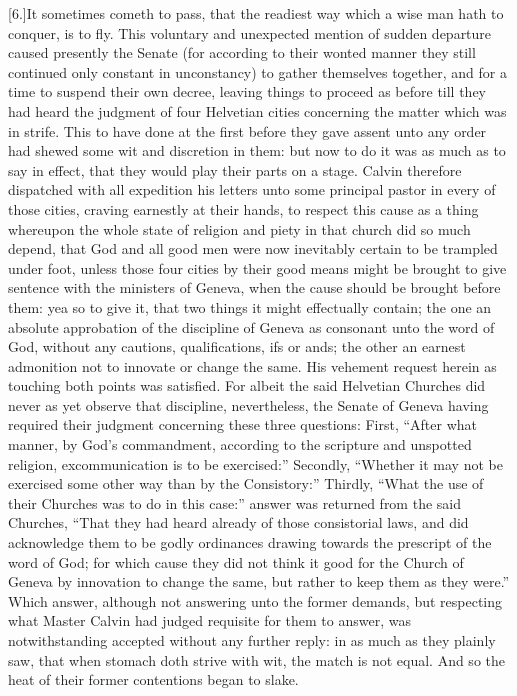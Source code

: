 [6.]It sometimes cometh to pass, that the readiest way which a wise man hath to conquer, is to fly. This voluntary and unexpected mention of sudden departure caused presently the Senate (for according to their wonted manner they still continued only constant in unconstancy) to gather themselves together, and for a time to suspend their own decree, leaving things to proceed as before till they had heard the judgment of four Helvetian cities concerning the matter which was in strife. This to have done at the first before they gave assent unto any order had shewed some wit and discretion in them: but now to do it was as much as to say in effect, that they would play their parts on a stage. Calvin therefore dispatched with all expedition his letters unto some principal pastor in every of those cities, craving earnestly at their hands, to respect this cause as a thing whereupon the whole state of religion and piety in that church did so much depend, that God and all good men were now inevitably certain to be trampled under foot, unless those four cities by their good means might be brought to give sentence with the ministers of Geneva, when the cause should be brought before them: yea so to give it, that two things it might effectually contain; the one an absolute approbation of the discipline of Geneva as consonant unto the word of God, without any cautions, qualifications, ifs or ands; the other an earnest admonition not to innovate or change the same. His vehement request herein as touching both points was satisfied. For albeit the said Helvetian Churches did never as yet observe that discipline, nevertheless, the Senate of Geneva having required their judgment concerning these three questions: First, “After what manner, by God’s commandment, according to the scripture and unspotted religion, excommunication is to be exercised:” Secondly, “Whether it may not be exercised some other way than by the Consistory:” Thirdly, “What the use of their Churches was to do in this case:” answer was returned from the said Churches, “That they had heard already of those consistorial laws, and did acknowledge them to be godly ordinances drawing towards the prescript of the word of God; for which cause they did not think it good for the Church of Geneva by innovation to change the same, but rather to keep them as they were.” Which answer, although not answering unto the former demands, but respecting what Master Calvin had judged requisite for them to answer, was notwithstanding accepted without any further reply: in as much as they plainly saw, that when stomach doth strive with wit, the match is not equal. And so the heat of their former contentions began to slake.

